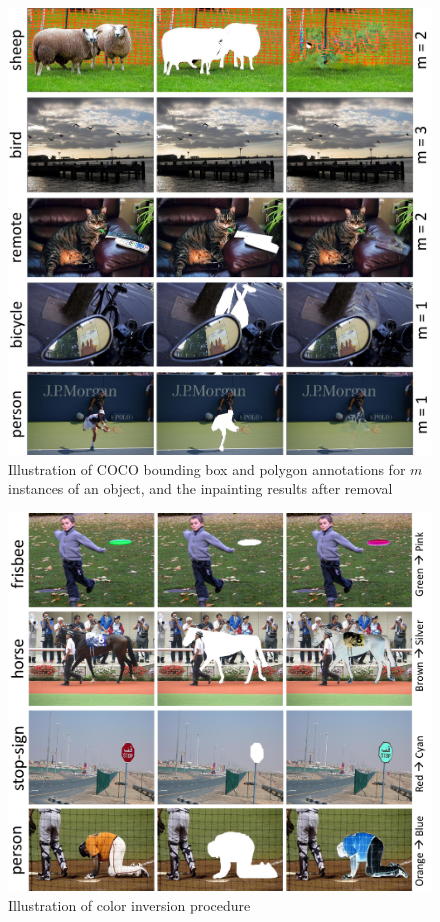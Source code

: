 \begin{figure}[t]
    \centering
    \includegraphics[width=\linewidth]{ figures/supp_inp.pdf}
    \caption{Illustration of COCO bounding box and polygon annotations for $m$ instances of an object, and the inpainting results after removal}
   
    \label{fig:bbox}
\end{figure}


\begin{figure}[t]
    \centering
    \includegraphics[width=\linewidth]{ figures/supp_col.pdf}
    \caption{Illustration of color inversion procedure}
    \label{fig:col}
\end{figure}

